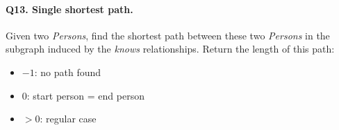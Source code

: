 \paragraph{\textbf{Q13}. Single shortest path.}
Given two \emph{Persons}, find the shortest path between these two
\emph{Persons} in the subgraph induced by the \emph{knows}
relationships.
Return the length of this path:
\begin{itemize}
\tightlist
\item
  \(-1\): no path found
\item
  \(0\): start person = end person
\item
  \(> 0\): regular case
\end{itemize}
